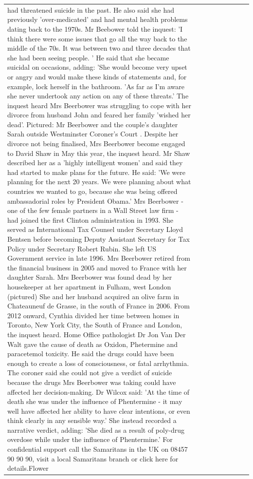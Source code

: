 \begin{table}[H]
\begin{tabular}{lllrlllll}
had threatened suicide in the past. He also said she had previously 'over-medicated' and had mental health problems dating back to the 1970s. Mr Beebower told the inquest: 'I think there were some issues that go all the way back to the middle of the 70s. It was between two and three decades that she had been seeing people. ' He said that she became suicidal on occasions, adding: 'She would become very upset or angry and would make these kinds of statements and, for example, lock herself in the bathroom. 'As far as I'm aware she never undertook any action on any of these threats.' The inquest heard Mrs Beerbower was struggling to cope with her divorce from husband John and feared her family 'wished her dead'. Pictured: Mr Beerbower and the couple's daughter Sarah outside Westminster Coroner's Court . Despite her divorce not being finalised, Mrs Beerbower become engaged to David Shaw in May this year, the inquest heard. Mr Shaw described her as a 'highly intelligent women' and said they had started to make plans for the future. He said: 'We were planning for the next 20 years. We were planning about what countries we wanted to go, because she was being offered ambassadorial roles by President Obama.' Mrs Beerbower - one of the few female partners in a Wall Street law firm - had joined the first Clinton administration in 1993. She served as International Tax Counsel under Secretary Lloyd Bentsen before becoming Deputy Assistant Secretary for Tax Policy under Secretary Robert Rubin. She left US Government service in late 1996. Mrs Beerbower retired from the financial business in 2005 and moved to France with her daughter Sarah. Mrs Beerbower was found dead by her housekeeper at her apartment in Fulham, west London (pictured) She and her husband acquired an olive farm in Chateauneuf de Grasse, in the south of France in 2006. From 2012 onward, Cynthia divided her time between homes in Toronto, New York City, the South of France and London, the inquest heard. Home Office pathologist Dr Jon Van Der Walt gave the cause of death as Oxidon, Phetermine and paracetemol toxicity. He said the drugs could have been enough to create a loss of consciousness, or fatal arrhythmia. The coroner said she could not give a verdict of suicide because the drugs Mrs Beerbower was taking could have affected her decision-making. Dr Wilcox said: 'At the time of death she was under the influence of Phentermine - it may well have affected her ability to have clear intentions, or even think clearly in any sensible way.' She instead recorded a narrative verdict, adding: 'She died as a result of poly-drug overdose while under the influence of Phentermine.' For confidential support call the Samaritans in the UK on 08457 90 90 90, visit a local Samaritans branch or click here for details.Flower \\

\end{tabular}
\end{table}
